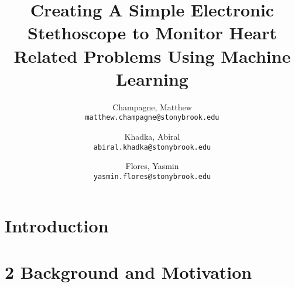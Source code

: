 \documentclass[twocolumn]{article}
\begin{document}
\title{Creating A Simple Electronic Stethoscope to Monitor Heart Related Problems Using Machine Learning}
\author{
  Champagne, Matthew \\
  \texttt{matthew.champagne@stonybrook.edu}
  \and
  Khadka, Abiral \\
  \texttt{abiral.khadka@stonybrook.edu}
  \and
  Flores, Yasmin \\
  \texttt{yasmin.flores@stonybrook.edu}
}

\maketitle

\section{Introduction}

\section{2 Background and Motivation} 





\appendix
\end{document}
